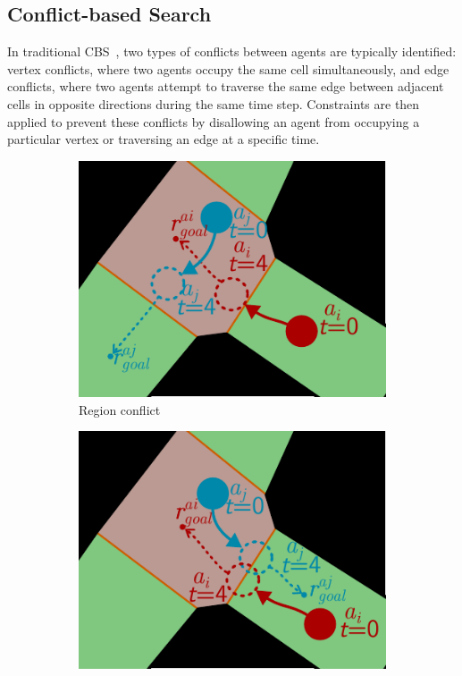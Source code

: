 \documentclass[letterpaper, 10 pt, conference]{ieeeconf}  %
\begin{document}
\subsection{Conflict-based Search} \label{sec:cbs}
In traditional CBS~\cite{sharon2015conflict}, two types of conflicts between agents are typically identified: vertex conflicts, where two agents occupy the same cell simultaneously, and edge conflicts, where two agents attempt to traverse the same edge between adjacent cells in opposite directions during the same time step. Constraints are then applied to prevent these conflicts by disallowing an agent from occupying a particular vertex or traversing an edge at a specific time.
\begin{figure}[tb]
    \centering
    \begin{subfigure}[b]{.4\linewidth}
         \centering
         \includegraphics[width=\linewidth]{figs/regionC.pdf}
         \caption{Region conflict}
         \label{fig:regionC}
    \end{subfigure}
    \begin{subfigure}[b]{.4\linewidth}
         \centering
         \includegraphics[width=\linewidth]{figs/openingC.pdf}

\end{subfigure}
\end{figure}
\end{document}
